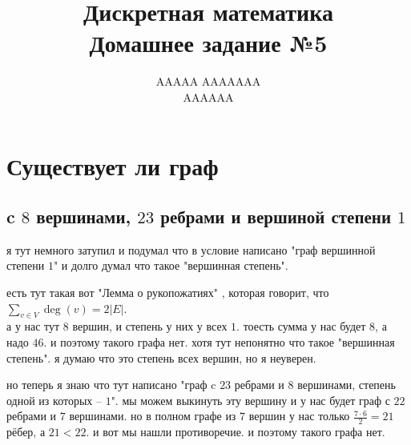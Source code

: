 \documentclass{article}
\title{Дискретная математика \\ Домашнее задание №5}
\author{AAAAA AAAAAAA \\ AAAAAA}
\newcommand{\ds}{\displaystyle}
\renewcommand{\f}{\frac}
\begin{document}
  \maketitle

  \section{Существует ли граф}
  \subsection{c $8$ вершинами, $23$ ребрами и вершиной степени $1$}
  я тут немного затупил и подумал что в условие написано "{}граф вершинной степени $1$"{}
  и долго думал что такое "{}вершинная степень"{}.
  \begin{cross}
    есть тут такая вот "{}Лемма о рукопожатиях"{} \cite{lem}, которая говорит, что $\ds \sum_{v\in V}\deg(v)=2|E|$. \\
    а у нас тут $8$ вершин, и степень у них у всех $1$.
    тоесть сумма у нас будет $8$, а надо $46$.
    и поэтому такого графа нет.
    хотя тут непонятно что такое "{}вершинная степень"{}.
    я думаю что это степень всех вершин, но я неуверен.
  \end{cross}

  но теперь я знаю что тут написано "{}граф c $23$ ребрами и $8$ вершинами, степень одной из которых -- $1$"{}.
  мы можем выкинуть эту вершину и у нас будет граф с $22$ ребрами и $7$ вершинами.
  но в полном графе из $7$ вершин у нас только $\f{7 \cdot 6}{2}=21$ рёбер, а $21 < 22$.
  и вот мы нашли противоречие.
  и поэтому такого графа нет.
\end{document}
